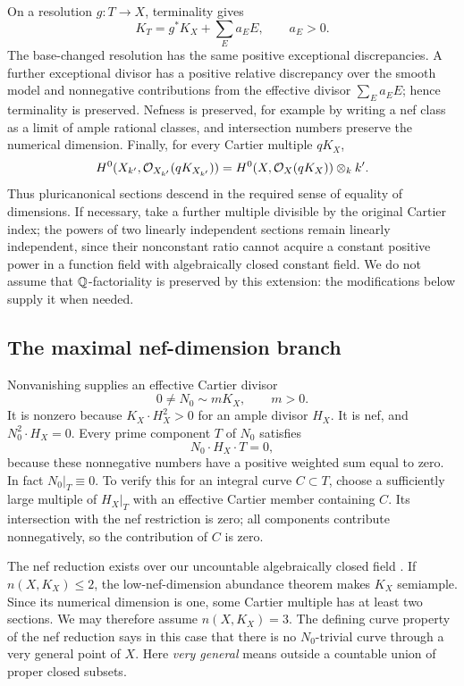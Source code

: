 On a resolution \(g:T\to X\), terminality gives
\[
 K_T=g^*K_X+\sum_E a_EE,\qquad a_E>0.
\]
The base-changed resolution has the same positive exceptional
discrepancies.  A further exceptional divisor has a positive relative
discrepancy over the smooth model and nonnegative contributions from
the effective divisor \(\sum_Ea_EE\); hence terminality is preserved.
Nefness is preserved, for example by writing a nef class as a limit of
ample rational classes, and intersection numbers preserve the numerical
dimension.  Finally, for every Cartier multiple \(qK_X\),
\[
 H^0(X_{k'},\mathcal O_{X_{k'}}(qK_{X_{k'}}))
   =H^0(X,\mathcal O_X(qK_X))\otimes_k k'.
\]
Thus pluricanonical sections descend in the required sense of equality
of dimensions.  If necessary, take a further multiple divisible by the
original Cartier index; the powers of two linearly independent sections
remain linearly independent, since their nonconstant ratio cannot acquire
a constant positive power in a function field with algebraically closed
constant field.  We do not assume that \(\mathbb Q\)-factoriality is preserved by
this extension: the modifications below supply it when needed.

\subsection{The maximal nef-dimension branch}

Nonvanishing \cite[Theorem~1.4]{xu2024} supplies an effective Cartier divisor
\[
 0\neq N_0\sim mK_X,\qquad m>0.
\]
It is nonzero because \(K_X\cdot H_X^2>0\) for an ample divisor \(H_X\).
It is nef, and \(N_0^2\cdot H_X=0\).
Every prime component \(T\) of \(N_0\) satisfies
\[
 N_0\cdot H_X\cdot T=0,
\]
because these nonnegative numbers have a positive weighted sum equal to
zero.  In fact \(N_0|_T\equiv0\).  To verify this for an integral curve
\(C\subset T\), choose a sufficiently large multiple of \(H_X|_T\) with
an effective Cartier member containing \(C\).  Its intersection with the
nef restriction is zero; all components contribute nonnegatively, so the
contribution of \(C\) is zero.

The nef reduction exists over our uncountable algebraically closed field
\cite[Definition~2.1 and Theorem~2.2]{xu2026}.
If \(n(X,K_X)\leq2\), the low-nef-dimension abundance theorem
\cite[Theorem~1.8]{xu2024} makes \(K_X\) semiample.  Since its numerical
dimension is one, some Cartier multiple has at least two sections.
We may therefore assume \(n(X,K_X)=3\).
The defining curve property of the nef reduction says in this case that
there is no \(N_0\)-trivial curve through a very general point of \(X\).
Here \emph{very general} means outside a countable union of proper closed
subsets.

